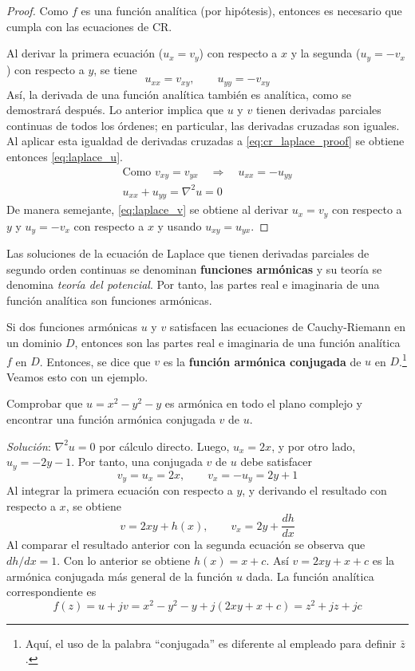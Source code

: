 \begin{proof}
  Como $f$ es una función analítica (por hipótesis), entonces es necesario que cumpla con las ecuaciones de CR.

  Al derivar la primera ecuación ($u_x = v_y$) con respecto a $x$ y la segunda ($u_y=-v_x$) con respecto a $y$, se tiene
  \begin{equation}\label{eq:cr_laplace_proof}
    u_{xx}=v_{xy}, \qquad u_{yy} = -v_{xy}
  \end{equation}
  Así, la derivada de una función analítica también es analítica, como se demostrará después. Lo anterior implica que $u$ y $v$ tienen derivadas parciales continuas de todos los órdenes; en particular, las derivadas cruzadas son iguales. Al aplicar esta igualdad de derivadas cruzadas a \ref{eq:cr_laplace_proof} se obtiene entonces \ref{eq:laplace_u}.
  \begin{gather*}
    \text{Como } v_{xy} = v_{yx} \quad \Rightarrow \quad u_{xx} = -u_{yy} \\
    u_{xx}+u_{yy}=\nabla^2 u=0 
  \end{gather*}
  De manera semejante, \ref{eq:laplace_v} se obtiene al derivar $u_x=v_y$ con respecto a $y$ y $u_y=-v_x$ con respecto a $x$ y usando $u_{xy}=u_{yx}$.
\end{proof}

Las soluciones de la ecuación de Laplace que tienen derivadas parciales de segundo orden continuas se denominan \textbf{funciones armónicas} y su teoría se denomina \textit{teoría del potencial}. Por tanto, las partes real e imaginaria de una función analítica son funciones armónicas.

Si dos funciones armónicas $u$ y $v$ satisfacen las ecuaciones de Cauchy-Riemann en un dominio $D$, entonces son las partes real e imaginaria de una función analítica $f$ en $D$. Entonces, se dice que $v$ es la \textbf{función armónica conjugada} de $u$ en $D$.\footnote{Aquí, el uso de la palabra ``conjugada'' es diferente al empleado para definir $\bar{z}$.} Veamos esto con un ejemplo.

\begin{example}
  Comprobar que $u=x^2-y^2 -y$ es armónica en todo el plano complejo y encontrar una función armónica conjugada $v$ de $u$.

  \textit{Solución}: $\nabla^2 u =0$ por cálculo directo. Luego, $u_x=2x$, y por otro lado, $u_y=-2y-1$. Por tanto, una conjugada $v$ de $u$ debe satisfacer
  \begin{equation*}
    v_y = u_x = 2x,\qquad v_x=-u_y = 2y+1
  \end{equation*}
  Al integrar la primera ecuación con respecto a $y$, y derivando el resultado con respecto a $x$, se obtiene
  \begin{equation*}
    v=2xy + h(x), \qquad v_x = 2y + \frac{dh}{dx}
  \end{equation*}
  Al comparar el resultado anterior con la segunda ecuación se observa que $dh/dx=1$. Con lo anterior se obtiene $h(x)=x+c$. Así $v=2xy+x+c$ es la armónica conjugada más general de la función $u$ dada. La función analítica correspondiente es
  \[
    f(z)=u+jv=x^2-y^2-y+j(2xy+x+c)=z^2 +jz +jc
  \]
\end{example}

